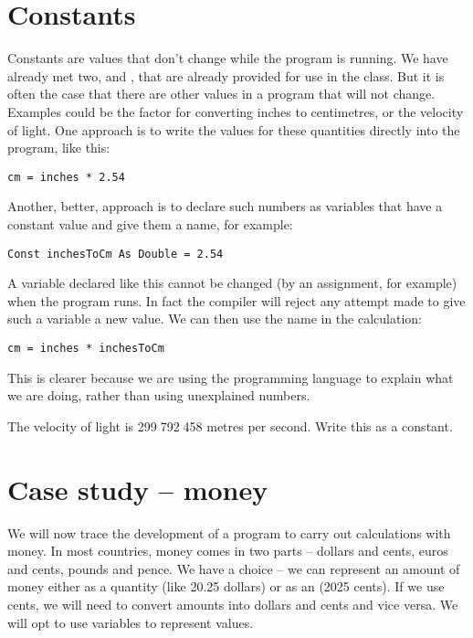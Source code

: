 	\section{Constants}
		Constants are values that don't change while the program is running. We have already met two,  and , that are already provided for use in the  class. But it is often the case that there are other values in a program that will not change. Examples could be the factor for converting inches to centimetres, or the velocity of light. One approach is to write the values for these quantities directly into the program, like this:
		\begin{lstlisting}
cm = inches * 2.54
		\end{lstlisting}
		Another, better, approach is to declare such numbers as variables that have a constant value and give them a name, for example:
		\begin{lstlisting}
Const inchesToCm As Double = 2.54
		\end{lstlisting}
		A variable declared like this cannot be changed (by an assignment, for example) when the program runs. In fact the compiler will reject any attempt made to give such a variable a new value. We can then use the name in the calculation:
		\begin{lstlisting}
cm = inches * inchesToCm
		\end{lstlisting}
		This is clearer because we are using the programming language to explain what we are doing, rather than using unexplained numbers.

		\begin{stqb}
			\begin{STQ}
				\item The velocity of light is 299 792 458 metres per second. Write this as a  constant.
			\end{STQ}
		\end{stqb}

		
	\section{Case study – money}
		We will now trace the development of a program to carry out calculations with money. In most countries, money comes in two parts – dollars and cents, euros and cents, pounds and pence. We have a choice – we can represent an amount of money either as a  quantity (like 20.25 dollars) or as an  (2025 cents). If we use cents, we will need to convert amounts into dollars and cents and vice versa. We will opt to use  variables to represent values.
		
